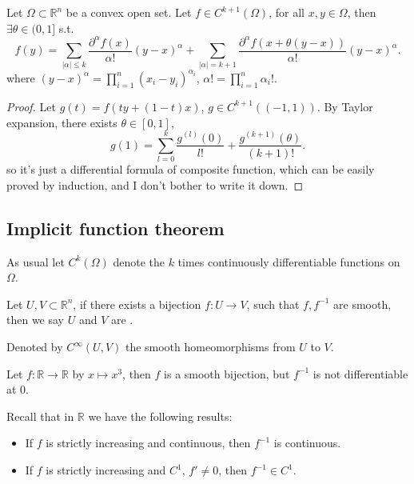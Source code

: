 \begin{theorem}
    Let $\Omega \subset \mathbb{R}^{n}$ be a convex open set.
	Let $f\in C^{k+1}(\Omega)$, for all $x,y\in \Omega$,
	then $\exists \theta\in (0,1]$ s.t.
	\[
	f(y) = \sum_{|\alpha|\le k} \frac{\partial^\alpha f(x)}{\alpha!}(y-x)^{\alpha}
	+ \sum_{|\alpha|=k+1} \frac{\partial^\alpha f(x+\theta(y-x))}{\alpha!}
	(y-x)^\alpha.
	\]
	where $(y - x)^\alpha = \prod_{i=1}^n(x_i-y_i)^{\alpha_i}$,
	$\alpha! = \prod_{i=1}^n \alpha_i !$.
\end{theorem}
\begin{proof}[Proof]
    Let $g(t) = f(ty + (1-t)x)$, $g\in C^{k+1}((-1,1))$.
	By Taylor expansion, there exists $\theta\in [0,1]$,
	\[
	g(1) = \sum_{l=0}^{k} \frac{g^{(l)}(0)}{l!} + \frac{g^{(k+1)}(\theta)}{(k+1)!}.
	\]
	so it's just a differential formula of composite function,
	which can be easily proved by induction,
	and I don't bother to write it down.
\end{proof}

\subsection{Implicit function theorem}
\label{sub:Implicit function theorem}

As usual let $C^k(\Omega)$ denote the $k$ times continuously differentiable
functions on $\Omega$.
\begin{definition}
	Let $U, V \subset \mathbb{R}^n$, if there exists a bijection $f: U\to V$,
	such that $f, f^{-1}$ are smooth, then we say $U$ and $V$ are
	.

	Denoted by $C^{\infty} (U, V)$ the smooth homeomorphisms from $U$ to $V$.
\end{definition}

\begin{example}
    Let $f: \mathbb{R}\to \mathbb{R}$ by $x\mapsto x^3$,
	then $f$ is a smooth bijection, but $f^{-1}$ is not differentiable at $0$.
\end{example}

Recall that in $\mathbb{R}$ we have the following results:
\begin{itemize}
	\item If $f$ is strictly increasing and continuous, then $f ^{-1}$ is
		continuous.
	\item If $f$ is strictly increasing and $C^1$, $f' \ne 0$,
		then $f^{-1}\in C^1$.
\end{itemize}

